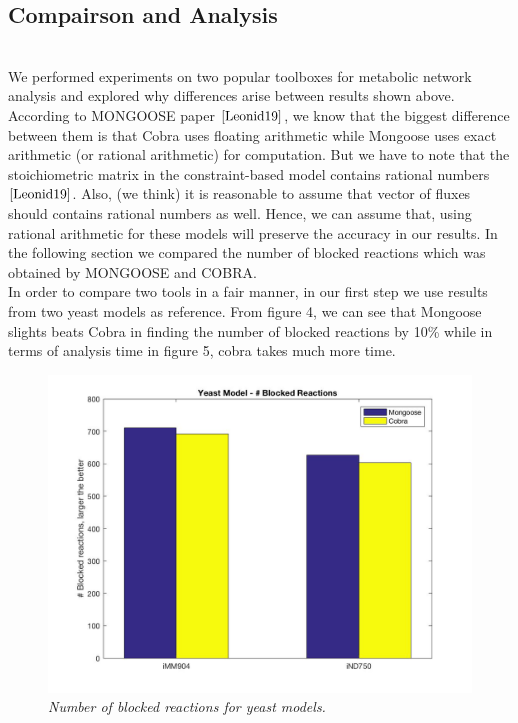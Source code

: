 \documentclass[11pt, a4paper]{article}
\begin{document}
	\subsection{Compairson and Analysis}
	~\\We performed experiments on two popular toolboxes for metabolic network analysis and explored why differences arise between results shown above. According to MONGOOSE paper $\cite{Leonid19}$, we know that the biggest difference between them is that Cobra uses floating arithmetic while Mongoose uses exact arithmetic (or rational arithmetic) for computation.  But we have to note that the stoichiometric matrix in the constraint-based model contains rational numbers$\cite{Leonid19}$. Also, (we think) it is reasonable to assume that vector of fluxes should contains rational numbers as well. Hence, we can assume that, using rational arithmetic for these models will preserve the accuracy in our results. In the following section we compared the number of blocked reactions which was obtained by MONGOOSE and COBRA. 
		~\\In order to compare two tools in a fair manner, in our first step we use results from two yeast models as reference. From figure 4, we can see that Mongoose slights beats Cobra in finding the number of blocked reactions by 10\% while in terms of analysis time in figure 5, cobra takes much more time.
	\begin{figure}[H]
  		\centering
      	\includegraphics[width=1\textwidth]{yeast_no_blocked_reaction.jpg}
      	\caption{\textit{Number of blocked reactions for yeast models.}}
	\end{figure}
\end{document}
